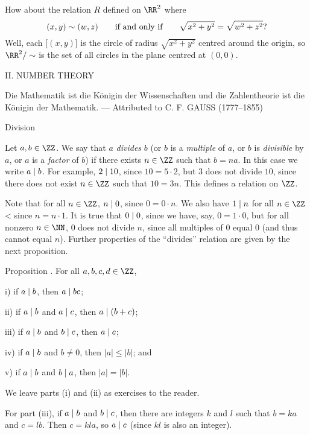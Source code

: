 How about the relation $R$ defined on $\RR^2$ where
$$(x,y)\sim (w,z) \qquad\hbox{if and only if}\qquad \sqrt{x^2+y^2} = \sqrt{w^2 + z^2}?$$
Well, each $\bigl[(x,y)\bigr]$ is the circle of radius $\sqrt{x^2 + y^2}$ centred
around the origin, so $\RR^2/\sim$ is the set of all circles in the plane centred at $(0,0)$.


\vfill\eject
\begingroup\headline{\hfil}\footline{\hfil}
\centerline{\titlefont II. NUMBER THEORY}
\vskip220pt
\bigskip
\begingroup\obeylines\eightssi
\hfill Die Mathematik ist die K\"onigin der Wissenschaften
\hfill und die Zahlentheorie ist die K\"onigin der Mathematik.
\eightss
\smallskip
\hfill --- {\eightssi Attributed to} C. F. GAUSS {\eightssi (1777--1855)}
\endgroup%
\bigskip\goodbreak
\vfill\eject

\advsect Division

Let $a,b\in \ZZ$. We say that $a$ {\it divides} $b$ (or $b$ is a {\it multiple} of $a$, or $b$ is {\it divisible}
by $a$, or $a$ is a {\it factor} of $b$) if there exists $n\in \ZZ$ such that $b=na$. In this
case we write $a\mid b$. For example, $2\mid 10$, since $10 = 5\cdot 2$, but
$3$ does not divide $10$, since there does not exist $n\in \ZZ$ such that $10 = 3n$.
This defines a relation on $\ZZ$.

Note that for all $n\in \ZZ$, $n\mid 0$, since $0 = 0\cdot n$. We also have
$1\mid n$ for all $n\in \ZZ$< since $n = n\cdot 1$. It is true that $0\mid 0$, since we
have, say, $0 = 1\cdot 0$, but for all nonzero $n\in \NN$, $0$ does not divide $n$, since all multiples
of $0$ equal $0$ (and thus cannot equal $n$). Further properties of the ``divides'' relation
are given by the next proposition.

\proclaim Proposition \advthm. For all $a,b,c,d\in \ZZ$,
\medskip
\item{i)} if $a\mid b$, then $a\mid bc$;
\smallskip
\item{ii)} if $a\mid b$ and $a\mid c$, then $a\mid (b+c)$;
\smallskip
\item{iii)} if $a\mid b$ and $b\mid c$, then $a\mid c$;
\smallskip
\item{iv)} if $a\mid b$ and $b\ne 0$, then $|a|\le |b|$; and
\smallskip
\item{v)} if $a\mid b$ and $b\mid a$, then $|a| = |b|$.
\medskip

\proof We leave parts (i) and (ii) as exercises to the reader.

For part (iii), if $a\mid b$ and $b\mid c$,
then there are integers $k$ and $l$ such that $b = ka$ and $c = lb$. Then $c = kla$, so $a\mid c$
(since $kl$ is also an integer).

